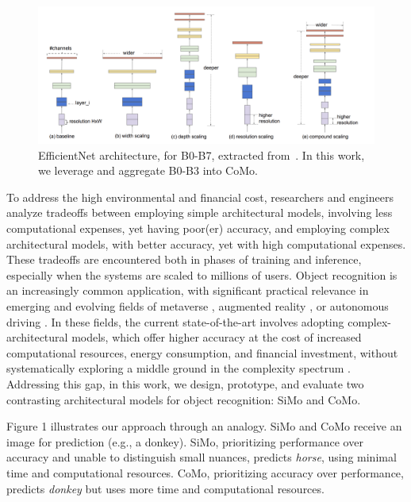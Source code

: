 \begin{figure}
    \centering
    \includegraphics[width=0.95\linewidth]{figures/f2.png}
    \caption{EfficientNet architecture, for B0-B7, extracted from~\cite{luntz1969estimation}. In this work, we leverage and aggregate B0-B3 into CoMo.}
    \label{fig:background:f2}
\end{figure}

To address the high environmental and financial cost, researchers and engineers analyze tradeoffs between employing simple architectural models, involving less computational expenses, yet having poor(er) accuracy, and employing complex architectural models, with better accuracy, yet with high computational expenses. These tradeoffs are encountered both in phases of training and inference, especially when the systems are scaled to millions of users. Object recognition is an increasingly common  application, with significant practical relevance in emerging and evolving fields of metaverse \cite{2024-hotcloudperf-metaverse-trace, 2023-hotcloudperf-metaverse}, augmented reality \cite{grigorescu2020survey, tomtom_augmented_2023}, or autonomous driving \cite{mao20233d}. In these fields, the current state-of-the-art involves adopting complex-architectural models, which offer higher accuracy at the cost of increased computational resources, energy consumption, and financial investment, without systematically exploring a middle ground in the complexity spectrum \cite{krishna2023complementary, schwenker20013d}. Addressing this gap, in this work, we design, prototype, and evaluate two contrasting architectural models for object recognition: SiMo and CoMo. 

Figure 1 illustrates our approach through an analogy. SiMo and CoMo receive an image for prediction (e.g., a donkey). SiMo, prioritizing performance over accuracy and unable to distinguish small nuances, predicts \textit{horse}, using minimal time and computational resources. CoMo, prioritizing accuracy over performance, predicts \textit{donkey} but uses more time and computational resources. 

